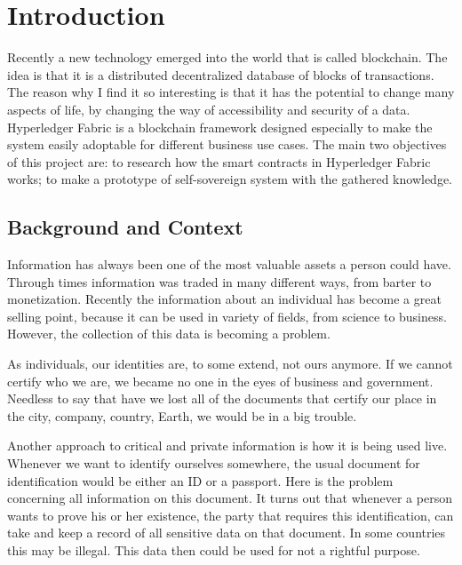 \documentclass[a4paper,11pt]{report}
\begin{document}
\clearpage


\setcounter{page}{1}



\chapter{Introduction}

\label{introduction}

Recently a new technology emerged into the world that is called blockchain. The idea is that it is a distributed decentralized database of blocks of transactions. The reason why I find it so interesting is that it has the potential to change many aspects of life, by changing the way of accessibility and security of a data. Hyperledger Fabric is a blockchain framework designed especially to make the system easily adoptable for different business use cases. The main two objectives of this project are: to research how the smart contracts in Hyperledger Fabric works; to make a prototype of self-sovereign system with the gathered knowledge. 

\section{Background and Context}

\label{introduction-background}

Information has always been one of the most valuable assets a person could have. Through times information was traded in many different ways, from barter to monetization. Recently the information about an individual has become a great selling point, because it can be used in variety of fields, from science to business. However, the collection of this data is becoming a problem.

	As individuals, our identities are, to some extend, not ours anymore. If we cannot certify who we are, we became no one in the eyes of business and government. Needless to say that have we lost all of the documents that certify our place in the city, company, country, Earth, we would be in a big trouble. \cite{allen2016path}
	
		Another approach to critical and private information is how it is being used live. Whenever we want to identify ourselves somewhere, the usual document for identification would be either an ID or a passport. Here is the problem concerning all information on this document. It turns out that whenever a person wants to prove his or her existence, the party that requires this identification, can take and keep a record of all sensitive data on that document. In some countries this may be illegal. This data then could be used for not a rightful purpose. \cite{alboaie2017private}
		
\end{document}
